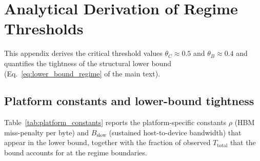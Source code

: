 
\appendix

\section{Analytical Derivation of Regime Thresholds}
\label{app:regime}

This appendix derives the critical threshold values $\theta_C \approx 0.5$ and
$\theta_B \approx 0.4$ and quantifies the tightness of the structural lower
bound (Eq.~\ref{eq:lower_bound_regime} of the main text).

\subsection{Platform constants and lower-bound tightness}
\label{app:constants}

Table~\ref{tab:platform_constants} reports the platform-specific constants
$\rho$ (HBM miss-penalty per byte) and $B_{\mathrm{slow}}$ (sustained
host-to-device bandwidth) that appear in the lower bound, together with
the fraction of observed $T_{\mathrm{total}}$ that the bound accounts for
at the regime boundaries.


